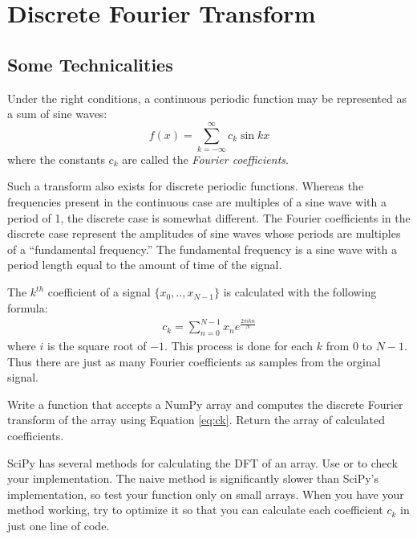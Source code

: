 \section*{Discrete Fourier Transform} %

\subsection*{Some Technicalities} %

Under the right conditions, a continuous periodic function may be represented as a sum of sine waves:
\[
f(x) = \displaystyle{\sum_{k=-\infty}^{\infty}} c_k \sin{kx}
\]
where the constants $c_k$ are called the \emph{Fourier coefficients}.

Such a transform also exists for discrete periodic functions.
Whereas the frequencies present in the continuous case are multiples of a sine wave with a period of 1, the discrete case is somewhat different.
The Fourier coefficients in the discrete case represent the amplitudes of sine waves whose periods are multiples of a ``fundamental frequency.''
The fundamental frequency is a sine wave with a period length equal to the amount of time of the signal.

The $k^{th}$ coefficient of a signal $\{x_0, .., x_{N-1}\}$ is calculated with the following formula:
\begin{align}
c_k = \displaystyle{\sum_{n=0}^{N-1}} x_n e^{\frac{2\pi ikn}{N}}\label{eq:ck}
\end{align}
where $i$ is the square root of $-1$.
This process is done for each $k$ from $0$ to $N-1$.
Thus there are just as many Fourier coefficients as samples from the orginal signal.

\begin{problem} %
Write a function that accepts a NumPy array and computes the discrete Fourier transform of the array using Equation \ref{eq:ck}.
Return the array of calculated coefficients.

SciPy has several methods for calculating the DFT of an array.
Use  or  to check your implementation.
The naive method is significantly slower than SciPy's implementation, so test your function only on small arrays.
When you have your method working, try to optimize it so that you can calculate each coefficient $c_k$ in just one line of code.
\end{problem}

